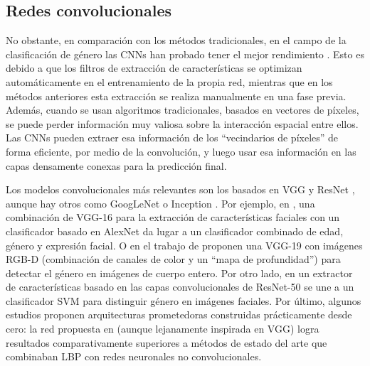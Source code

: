 \subsection{Redes convolucionales\label{SUBSEC:CNNS}}

No obstante, en comparación con los métodos tradicionales, en el campo de la clasificación de género las CNNs han probado tener el mejor rendimiento \cite{ahmed2019facial,rezaoana2020detection,wu2020gender}. Esto es debido a que los filtros de extracción de características se optimizan automáticamente en el entrenamiento de la propia red, mientras que en los métodos anteriores esta extracción se realiza manualmente en una fase previa. Además, cuando se usan algoritmos tradicionales, basados en vectores de píxeles, se puede perder información muy valiosa sobre la interacción espacial entre ellos. Las CNNs pueden extraer esa información de los ``vecindarios de píxeles'' de forma eficiente, por medio de la convolución, y luego usar esa información en las capas densamente conexas para la predicción final.


Los modelos convolucionales más relevantes son los basados en VGG \cite{simonyan2014very} y ResNet \cite{he2016deep}, aunque hay otros como GoogLeNet o Inception \cite{szegedy2015going}. Por ejemplo, en \citet{gurnani2019saf}, una combinación de VGG-16 para la extracción de características faciales con un clasificador basado en AlexNet \cite{krizhevsky2017imagenet} da lugar a un clasificador combinado de edad, género y expresión facial. O en el trabajo de  \citet{zhang2020gender} proponen una VGG-19 con imágenes RGB-D (combinación de canales de color y un ``mapa de profundidad'') para detectar el género en imágenes de cuerpo entero. Por otro lado, en \citet{lin2020face} un extractor de características basado en las capas convolucionales de ResNet-50 se une a un clasificador SVM para distinguir género en imágenes faciales. Por último, algunos estudios proponen arquitecturas prometedoras construidas prácticamente desde cero: la red propuesta en \citet{sumi2021human} (aunque lejanamente inspirada en VGG) logra resultados comparativamente superiores a métodos de estado del arte que combinaban LBP con redes neuronales no convolucionales.
 



